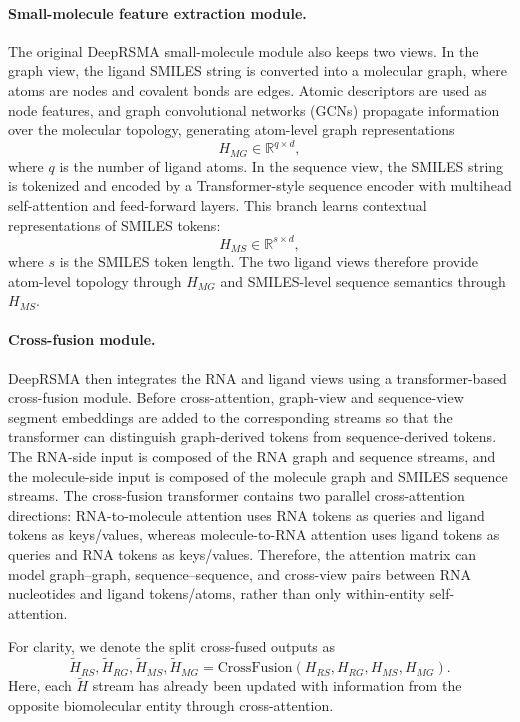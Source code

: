\documentclass[journal=jcisd8,manuscript=article]{achemso}
\begin{document}
\paragraph{Small-molecule feature extraction module.}
The original DeepRSMA small-molecule module also keeps two views. In the graph view, the ligand SMILES string is converted into a molecular graph, where atoms are nodes and covalent bonds are edges. Atomic descriptors are used as node features, and graph convolutional networks (GCNs) propagate information over the molecular topology,\cite{Kipf2017GCN} generating atom-level graph representations
\begin{equation}
H_{MG} \in \mathbb{R}^{q \times d},
\end{equation}
where $q$ is the number of ligand atoms. In the sequence view, the SMILES string is tokenized and encoded by a Transformer-style sequence encoder with multihead self-attention and feed-forward layers.\cite{Vaswani2017Attention} This branch learns contextual representations of SMILES tokens:
\begin{equation}
H_{MS} \in \mathbb{R}^{s \times d},
\end{equation}
where $s$ is the SMILES token length. The two ligand views therefore provide atom-level topology through $H_{MG}$ and SMILES-level sequence semantics through $H_{MS}$.

\paragraph{Cross-fusion module.}
DeepRSMA then integrates the RNA and ligand views using a transformer-based cross-fusion module. Before cross-attention, graph-view and sequence-view segment embeddings are added to the corresponding streams so that the transformer can distinguish graph-derived tokens from sequence-derived tokens. The RNA-side input is composed of the RNA graph and sequence streams, and the molecule-side input is composed of the molecule graph and SMILES sequence streams. The cross-fusion transformer contains two parallel cross-attention directions: RNA-to-molecule attention uses RNA tokens as queries and ligand tokens as keys/values, whereas molecule-to-RNA attention uses ligand tokens as queries and RNA tokens as keys/values. Therefore, the attention matrix can model graph--graph, sequence--sequence, and cross-view pairs between RNA nucleotides and ligand tokens/atoms, rather than only within-entity self-attention.

For clarity, we denote the split cross-fused outputs as
\begin{equation}
\tilde{H}_{RS},\tilde{H}_{RG},\tilde{H}_{MS},\tilde{H}_{MG} =
\mathrm{CrossFusion}(H_{RS},H_{RG},H_{MS},H_{MG}).
\end{equation}
Here, each $\tilde{H}$ stream has already been updated with information from the opposite biomolecular entity through cross-attention.
\end{document}
